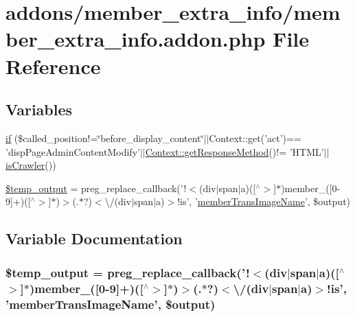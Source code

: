 \hypertarget{member__extra__info_8addon_8php}{\section{addons/member\-\_\-extra\-\_\-info/member\-\_\-extra\-\_\-info.addon.\-php File Reference}
\label{member__extra__info_8addon_8php}
}
\subsection*{Variables}
\begin{DoxyCompactItemize}
\item 
\hyperlink{member__extra__info_8addon_8php_afea24ae1a19d6cc573dc578087a6b3e6}{if} (\$called\-\_\-position!=\char`\"{}before\-\_\-display\-\_\-content\char`\"{}$|$$|$Context\-::get('act')== 'disp\-Page\-Admin\-Content\-Modify'$|$$|$\hyperlink{classContext_a1d02a15209360034cd719d8b08cb5061}{Context\-::get\-Response\-Method}()!= 'H\-T\-M\-L'$|$$|$\hyperlink{func_8inc_8php_a490ffbd4821da1995c76c381553d5b3d}{is\-Crawler}())
\item 
\hyperlink{member__extra__info_8addon_8php_a5866ef6f77cbeaf87d8208cf805bbc3d}{\$temp\-\_\-output} = preg\-\_\-replace\-\_\-callback('!$<$(div$|$span$|$a)(\mbox{[}$^\wedge$$>$\mbox{]}$\ast$)member\-\_\-(\mbox{[}0-\/9\mbox{]}+)(\mbox{[}$^\wedge$$>$\mbox{]}$\ast$)$>$(.$\ast$?)$<$\textbackslash{}/(div$|$span$|$a)$>$!is', '\hyperlink{member__extra__info_8lib_8php_a21882e797e0da66aed32f1cf3053eaf2}{member\-Trans\-Image\-Name}', \$output)
\end{DoxyCompactItemize}


\subsection{Variable Documentation}
\hypertarget{member__extra__info_8addon_8php_a5866ef6f77cbeaf87d8208cf805bbc3d}{
\subsubsection[{\$temp\-\_\-output}]{\setlength{\rightskip}{0pt plus 5cm}\$temp\-\_\-output = preg\-\_\-replace\-\_\-callback('!$<$(div$|$span$|$a)(\mbox{[}$^\wedge$$>$\mbox{]}$\ast$)member\-\_\-(\mbox{[}0-\/9\mbox{]}+)(\mbox{[}$^\wedge$$>$\mbox{]}$\ast$)$>$(.$\ast$?)$<$\textbackslash{}/(div$|$span$|$a)$>$!is', '{\bf member\-Trans\-Image\-Name}', \$output)}}\label{member__extra__info_8addon_8php_a5866ef6f77cbeaf87d8208cf805bbc3d}


